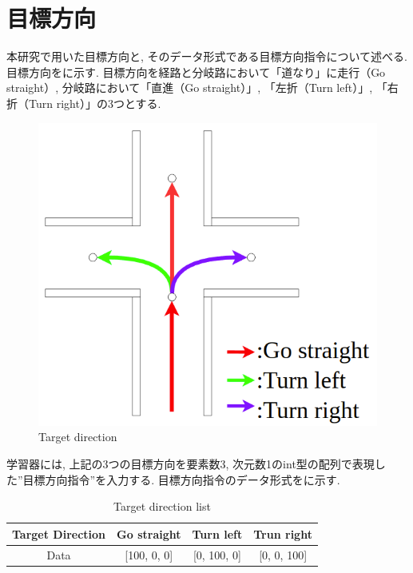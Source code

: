 
\section{目標方向}
本研究で用いた目標方向と, そのデータ形式である目標方向指令について述べる. 目標方向をに示す. 目標方向を経路と分岐路において「道なり」に走行（Go straight）, 分岐路において「直進（Go straight）」, 「左折（Turn left）」, 「右折（Turn right）」の3つとする.

\begin{figure}[hbtp]
  \centering
 \includegraphics[keepaspectratio, scale=0.45]
      {images/direction.png}
 \caption{Target direction}
 \label{Fig:direction}
\end{figure}

学習器には, 上記の3つの目標方向を要素数3, 次元数1のint型の配列で表現した”目標方向指令”を入力する. 目標方向指令のデータ形式をに示す.

\begin{table}[hbtp]
  \caption{Target direction list}
  \label{table:direction}
  \centering
  \begin{tabular}{|c|c|c|c|}
    \hline
    Target Direction  & Go straight & Turn left & Trun right\\
    \hline
    Data & [100, 0, 0] & [0, 100, 0] & [0, 0, 100]\\
    \hline
  \end{tabular}
\end{table}


\newpage
